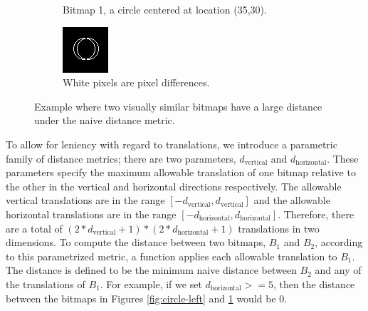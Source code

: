 \documentclass[12pt]{article}
\begin{document}
\begin{figure}[ht]
\begin{subfigure}[b]{.3\linewidth}
\caption{Bitmap 1, a circle centered at location (35,30).}
\label{fig:circle-right}
\end{subfigure}
\hspace{2mm}
\begin{subfigure}[b]{.3\linewidth}
\includegraphics[width=\linewidth]{circle-diff.png}
\caption{White pixels are pixel differences.}
\label{fig:circle-diff}
\end{subfigure}
\caption{Example where two visually similar bitmaps have a large distance under the naive distance metric.}
\label{fig:naive-distance-problem}
\end{figure}


To allow for leniency with regard to translations, we introduce a parametric family of distance metrics; there are two parameters, $d_{\text{vertical}}$ and $d_{\text{horizontal}}$.  These parameters specify the maximum allowable translation of one bitmap relative to the other in the vertical and horizontal directions respectively.  The allowable vertical translations are in the range $[-d_{\text{vertical}}, d_{\text{vertical}}]$ and the allowable horizontal translations are in the range $[-d_{\text{horizontal}}, d_{\text{horizontal}}]$.  Therefore, there are a total of $(2*d_{\text{vertical}}+1)*(2*d_{\text{horizontal}}+1)$ translations in two dimensions.  To compute the distance between two bitmaps, $B_1$ and $B_2$, according to this parametrized metric, a function applies each allowable translation to $B_1$.  The distance is defined to be the minimum naive distance between $B_2$ and any of the translations of $B_1$.  For example, if we set $d_{\text{horizontal}} >= 5$, then the distance between the bitmaps in Figures \ref{fig:circle-left} and \ref{fig:circle-right} would be 0.
\end{document}
